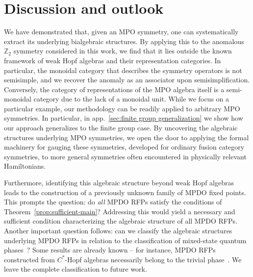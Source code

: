 \documentclass[prx, twocolumn, superscriptaddress, dvipsnames]{revtex4-2}
\theoremstyle{definition}
\begin{document}
\section{Discussion and outlook}
We have demonstrated that, given an MPO symmetry, one can systematically extract its underlying bialgebraic structures. By applying this to the anomalous $\mathbb Z_2$ symmetry considered in this work, we find that it lies outside the known framework of weak Hopf algebras and their representation categories. In particular, the monoidal category that describes the symmetry operators is not semisimple, and we recover the anomaly as an associator upon semisimplification. Conversely, the category of representations of the MPO algebra itself is a semi-monoidal category due to the lack of a monoidal unit. While we focus on a particular example, our methodology can be readily applied to arbitrary MPO symmetries. In particular, in app.~\ref{sec:finite group generalization} we show how our approach generalizes to the finite group case. By uncovering the algebraic structures underlying MPO symmetries, we open the door to applying the formal machinery for gauging these symmetries, developed for ordinary fusion category symmetries, to more general symmetries often encountered in physically relevant Hamiltonians. 

Furthermore, identifying this algebraic structure beyond weak Hopf algebras leads to the construction of a previously unknown family of MPDO fixed points. This prompts the question: do \textit{all} MPDO RFPs satisfy the conditions of Theorem~\ref{prop:sufficient-main}? Addressing this would yield a necessary and sufficient condition characterizing the algebraic structure of all MPDO RFPs. Another important question follows: can we classify the algebraic structures underlying MPDO RFPs in relation to the classification of mixed-state quantum phases~\cite{coser2019classification,de2022symmetry,ma2023average,sang2024mixed,ellison2024towards,sohal2025noisy,sun2025anomalous}? Some results are already known -- for instance, MPDO RFPs constructed from $C^*$-Hopf algebras necessarily belong to the trivial phase~\cite{ruiz2024matrix}. We leave the complete classification to future work. 
\end{document}
